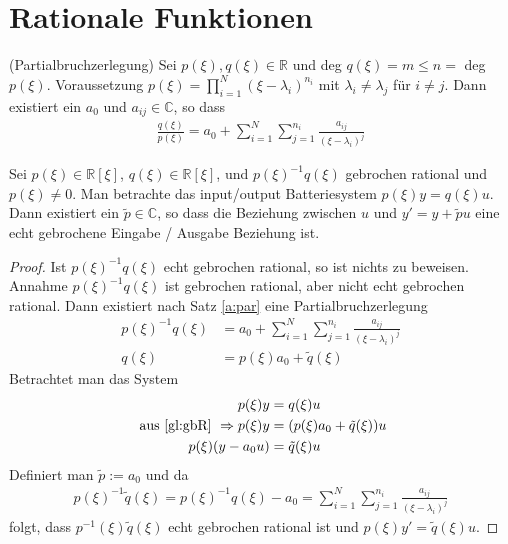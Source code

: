 \section{Rationale Funktionen}
\begin{satz}(Partialbruchzerlegung)\label{a:par}
Sei $p(\xi), q(\xi) \in \mathbb{R}$ und deg $q(\xi) = m \leq n =$ deg $p(\xi)$. Voraussetzung $p(\xi) = \prod_{i=1}^N{(\xi -\lambda_i)^{n_i}}$ mit $\lambda_i \neq \lambda_j$ für $i \neq j$. Dann existiert ein $a_0$ und $a_{ij} \in \mathbb{C}$, so dass 
\begin{align}
	\frac{q(\xi)}{p(\xi)} = a_0 + \sum_{i=1}^{N}{\sum_{j=1}^{n_i}{\frac{a_{ij}}{(\xi - \lambda_i)^j}}}
\end{align}
\end{satz}
\cite[S.417]{Polderman1997}
\begin{satz}\label{s:makeerational}
Sei $p(\xi) \in \mathbb{R}[\xi]$, $q(\xi) \in \mathbb{R}[\xi]$, und $p(\xi)^{-1}q(\xi)$ gebrochen rational und $p(\xi) \neq 0$. Man betrachte das input/output Batteriesystem $p(\xi) y = q(\xi) u$. Dann existiert ein $\tilde{p} \in \mathbb{C}$, so dass die Beziehung zwischen $u$ und $y'=y+\tilde{p}u$ eine echt gebrochene Eingabe / Ausgabe Beziehung ist.
\begin{proof}
Ist $p(\xi)^{-1}q(\xi)$ echt gebrochen rational, so ist nichts zu beweisen. Annahme $p(\xi)^{-1}q(\xi)$ ist gebrochen rational, aber nicht echt gebrochen rational. Dann existiert nach Satz \ref{a:par} eine Partialbruchzerlegung 
	\begin{align}
		p(\xi)^{-1}q(\xi) &= a_0 +  \sum_{i=1}^{N}{\sum^{n_i}_{j=1}{\frac{a_{ij}}{(\xi - \lambda_i)^j}}}\\
		q(\xi) &= p(\xi)a_0 + \tilde{q}(\xi) \label{gl:gbR}
	\end{align} 
Betrachtet man das System  
	\begin{align}
		p(\xi)y &= q(\xi) u \\
		\text{ aus \ref{gl:gbR} }  \Rightarrow p(\xi) y &= (p(\xi)a_0 + \tilde{q}(\xi))u\\
		p(\xi) (y-a_0u) &= \tilde{q}(\xi)u
	\end{align}
	Definiert man $\tilde{p}:=a_0$ und da
	\begin{align}
		p(\xi)^{-1}\tilde{q}(\xi) = p(\xi)^{-1}q(\xi) - a_0 = \sum_{i=1}^{N}{\sum_{j=1}^{n_i}{\frac{a_{ij}}{(\xi - \lambda_i)^j}}}
	\end{align}
	folgt, dass $p^{-1}(\xi)\tilde{q}(\xi)$ echt gebrochen rational ist und $p(\xi) y' = \tilde{q}(\xi)u$.
\end{proof}
\end{satz}
